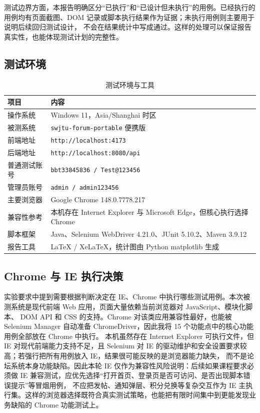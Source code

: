 \documentclass[bwprint]{report}
\begin{document}
测试边界方面，本报告明确区分“已执行”和“已设计但未执行”的用例。已经执行的用例均有页面截图、DOM 记录或脚本执行结果作为证据；未执行用例则主要用于说明后续回归测试设计，
不会在结果统计中写成通过。这样的处理可以保证报告真实性，也能体现测试计划的完整性。

\subsection{测试环境}
\begin{table}[H]
\centering
\caption{测试环境与工具}
\begin{tabular}{p{} p{}}
\toprule
项目 & 内容 \\
\midrule
操作系统 & Windows 11，Asia/Shanghai 时区 \\
被测系统 & \texttt{swjtu-forum-portable} 便携版 \\
前端地址 & \texttt{http://localhost:4173} \\
后端地址 & \texttt{http://localhost:8080/api} \\
普通测试账号 & \texttt{bbt33845836 / Test@123456} \\
管理员账号 & \texttt{admin / admin123456} \\
主要浏览器 & Google Chrome 148.0.7778.217 \\
兼容性参考 & 本机存在 Internet Explorer 与 Microsoft Edge，但核心执行选择 Chrome \\
脚本框架 & Java、Selenium WebDriver 4.21.0、JUnit 5.10.2、Maven 3.9.12 \\
报告工具 & \LaTeX{} / XeLaTeX，统计图由 Python matplotlib 生成 \\
\bottomrule
\end{tabular}
\end{table}

\subsection{Chrome 与 IE 执行决策}
实验要求中提到需要根据判断决定在 IE、Chrome 中执行哪些测试用例。本次被测系统是现代前端 Web 应用，页面大量依赖当前浏览器对 JavaScript、模块化脚本、
DOM API 和 CSS 的支持。Chrome 对该类应用兼容性最好，也能被 Selenium Manager 自动准备 ChromeDriver，因此我将 15 个功能点中的核心功能用例全部放在 Chrome 中执行。
本机虽然存在 Internet Explorer 可执行文件，但 IE 对现代前端能力支持不足，且 Selenium 对 IE 的驱动维护和安全设置要求较高；若强行把所有用例放入 IE，结果很可能反映的是浏览器能力缺失，
而不是论坛系统本身功能缺陷。因此本轮 IE 仅作为兼容性风险说明：后续如果课程要求必须做 IE 兼容测试，应优先选择“打开首页、登录页是否可访问、是否出现脚本错误提示”等冒烟用例，
不应把发帖、通知弹层、积分兑换等复杂交互作为 IE 主执行集。这样的浏览器选择既符合真实测试策略，也能把有限时间集中到更能发现业务缺陷的 Chrome 功能测试上。
\end{document}
